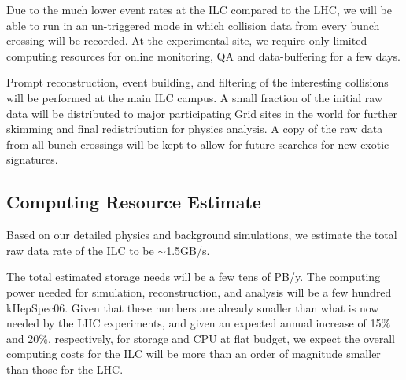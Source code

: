 Due to the much lower event rates at the ILC compared to the LHC, we will be
able to run in an un-triggered mode in which  collision data from every bunch crossing will be recorded. At the experimental site,
we require only limited computing resources for online monitoring, QA and data-buffering for a few days.

Prompt reconstruction, event building, and filtering of the interesting collisions will be performed at the main ILC campus.
A small fraction of the initial raw data will be distributed to major participating Grid sites in the world for further skimming and
final redistribution for physics analysis.
A copy of the raw data from all bunch crossings will be kept to allow  for future searches for new exotic signatures.


\subsection{\label{sub:sw-res-estimate}Computing Resource Estimate}

Based on our detailed physics and background simulations,  we estimate the total raw data rate of the ILC to be $\sim$1.5GB/s.

The total estimated storage needs will be a few tens of PB/y.
The computing power needed for simulation, reconstruction, and analysis will be a few hundred kHepSpec06.
Given that these numbers are already smaller than what is now
needed by the LHC experiments, and given an expected annual increase
of 15\% and 20\%, respectively, for storage and CPU
at flat budget, we expect the overall computing costs for the ILC
will be more than an order of magnitude smaller than those for the LHC.




